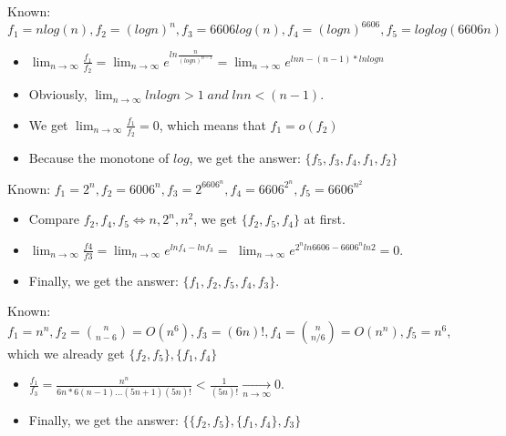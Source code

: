 \documentclass[12pt,twoside]{article}
\begin{document}


\begin{problems}

\problem  %

\begin{problemparts}
\problempart %
Known: $f_1=nlog(n),f_2=(logn)^n,f_3=6606log(n),f_4=(logn)^{6606},f_5=loglog(6606n)$

\begin{itemize}
    \item $\lim_{n\to \infty}\frac{f_1}{f_2}=\lim_{n\to \infty}e^{ln\frac{n}{(logn)^{n-1}}}=
        \lim_{n\to \infty}e^{lnn-(n-1)*lnlogn}$
    \item Obviously, $\lim_{n\to \infty}lnlogn>1\;and\;lnn<(n-1)$.
    \item We get $\lim_{n\to \infty}\frac{f_1}{f_2}=0$, which means that $f_1=o(f_2)$
    \item Because the monotone of $log$, we get the answer: $\{f_5,f_3,f_4,f_1,f_2\}$
\end{itemize}

\problempart %
Known: $f_1=2^n,f_2=6006^n,f_3=2^{6606^n},f_4=6606^{2^n},f_5=6606^{n^2}$

\begin{itemize}
    \item Compare $f_2,f_4,f_5\Leftrightarrow  n,2^n,n^2$, we get $\{f_2,f_5,f_4\}$ at first. 
    \item $\lim_{n\to \infty}\frac{f4}{f3}=\lim_{n\to \infty}e^{lnf_4-lnf_3}=$
            $\lim_{n\to \infty}e^{2^nln6606-6606^nln2}=0$.
    \item Finally, we get the answer: $\{f_1,f_2,f_5,f_4,f_3\}$.
\end{itemize}

\problempart %
Known: $f_1=n^n,f_2=\binom{n}{n-6}=O(n^6),f_3=(6n)!,f_4=\binom{n}{n/6}=O(n^n),f_5=n^6$,
which we already get $\{f_2,f_5\},\{f_1,f_4\}$

\begin{itemize}
    \item $\frac{f_1}{f_3}=\frac{n^n}{6n*6(n-1)...(5n+1)(5n)!}<\frac{1}{(5n)!}\xrightarrow[n\to\infty]{}0$. 
    \item Finally, we get the answer: \sout{$\{\{f_2,f_5\},\{f_1,f_4\},f_3\}$}
\end{itemize}


\end{problemparts}
\end{problems}
\end{document}
